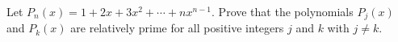 Let $P_n(x)=1+2x+3x^2+\cdots+nx^{n-1}.$ Prove that the polynomials $P_j(x)$ and $P_k(x)$ are relatively prime for all positive integers $j$ and $k$ with $j\ne k.$